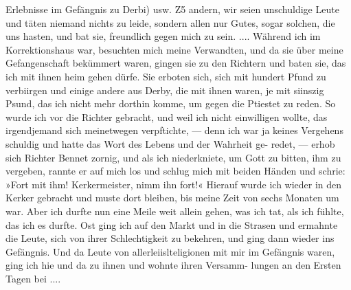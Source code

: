 Erlebnisse im Gefängnis zu Derbi) usw. Z5
andern, wir seien unschuldige Leute und täten niemand nichts zu
leide, sondern allen nur Gutes, sogar solchen, die uns hasten,
und bat sie, freundlich gegen mich zu sein. ....
Während ich im Korrektionshaus war, besuchten mich meine
Verwandten, und da sie über meine Gefangenschaft bekümmert
waren, gingen sie zu den Richtern und baten sie, das ich mit
ihnen heim gehen dürfe. Sie erboten sich, sich mit hundert Pfund
zu verbiirgen und einige andere aus Derby, die mit ihnen waren,
je mit siinszig Psund, das ich nicht mehr dorthin komme, um
gegen die Ptiestet zu reden. So wurde ich vor die Richter
gebracht, und weil ich nicht einwilligen wollte, das irgendjemand
sich meinetwegen verpftichte, — denn ich war ja keines Vergehens
schuldig und hatte das Wort des Lebens und der Wahrheit ge-
redet, — erhob sich Richter Bennet zornig, und als ich niederkniete, um
Gott zu bitten, ihm zu vergeben, rannte er auf mich los und schlug
mich mit beiden Händen und schrie: »Fort mit ihm! Kerkermeister,
nimm ihn fort!« Hierauf wurde ich wieder in den Kerker gebracht
und muste dort bleiben, bis meine Zeit von sechs Monaten um
war. Aber ich durfte nun eine Meile weit allein gehen, was ich
tat, als ich fühlte, das ich es durfte. Ost ging ich auf den Markt
und in die Strasen und ermahnte die Leute, sich von ihrer
Schlechtigkeit zu bekehren, und ging dann wieder ins Gefängnis.
Und da Leute von allerleiislteligionen mit mir im Gefängnis
waren, ging ich hie und da zu ihnen und wohnte ihren Versamm-
lungen an den Ersten Tagen bei ....